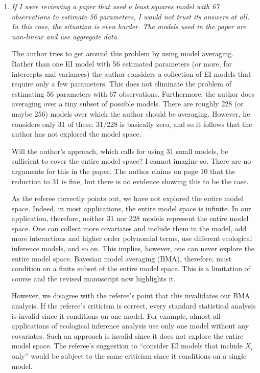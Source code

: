 \documentclass[11pt]{article}
\begin{document}
\begin{enumerate}
\item {\it If I were reviewing a paper that used a least squares model
    with 67 observations to estimate 56 parameters, I would not trust
    its answers at all.  In this case, the situation is even harder.
    The models used in the paper are non-linear and use aggregate
    data.
    
    The author tries to get around this problem by using model
    averaging.  Rather than one EI model with 56 estimated parameters
    (or more, for intercepts and variances) the author considers a
    collection of EI models that require only a few parameters.  This
    does not eliminate the problem of estimating 56 parameters with 67
    observations.  Furthermore, the author does averaging over a tiny
    subset of possible models.  There are roughly 228 (or maybe 256)
    models over which the author should be averaging.  However, he
    considers only 31 of these.  31/228 is basically zero, and so it
    follows that the author has not explored the model space. 
    
    Will the author's approach, which calls for using 31 small models,
    be sufficient to cover the entire model space?  I cannot imagine
    so.  There are no arguments for this in the paper.  The author
    claims on page 10 that the reduction to 31 is fine, but there is
    no evidence showing this to be the case.}
  
  As the referee correctly points out, we have not explored the entire
  model space. Indeed, in most applications, the entire model space is
  infinite. In our application, therefore, neither 31 nor 228 models
  represent the entire model space.  One can collect more covariates
  and include them in the model, add more interactions and higher
  order polynomial terms, use different ecological inference models,
  and so on.  This implies, however, one can never explore the entire
  model space.  Bayesian model averaging (BMA), therefore, must
  condition on a finite subset of the entire model space.  This is a
  limitation of course and the revised manuscript now highlights it.
  
  However, we disagree with the referee's point that this invalidates
  our BMA analysis. If the referee's criticism is correct, every
  standard statistical analysis is invalid since it conditions on one
  model.  For example, almost all applications of ecological
  inference analysis use only one model without any covariates. Such
  an approach is invalid since it does not explore the entire model
  space.  The referee's suggestion to ``consider EI models that
  include $X_i$ only'' would be subject to the same criticism since it
  conditions on a single model.
  

\end{enumerate}
\end{document}
